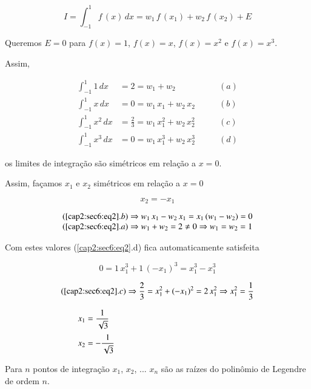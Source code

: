 \begin{enumerate}
\begin{equation}
 \label{cap2:sec6:eq1}
 I = \int_{-1}^1 f\,(x) \, dx = w_1 \, f\,(x_1) + w_2 \, f\,(x_2) + E
\end{equation}

Queremos $E=0$ para $f(x)=1$, $f(x)=x$, $f(x)=x^{2}$ e $f(x)=x^{3}$.

Assim,

\begin{equation}
 \label{cap2:sec6:eq2}
 \begin{array}{llr}
  \int_{-1}^1 1 \, dx & = 2 = w_1 + w_2 \qquad & (a) \\
  \int_{-1}^1 x \, dx & = 0 = w_1\,x_1 + w_2\,x_2 \qquad & (b) \\
  \int_{-1}^1 x^2 \, dx & = \displaystyle \frac{2}{3} = w_1\,x_1^2 + w_2\,x_2^2 \qquad & (c) \\
  \int_{-1}^1 x^3 \, dx & = 0 = w_1\,x_1^3 + w_2\,x_2^3 \qquad & (d)
 \end{array}
\end{equation}

os limites de integração são simétricos em relação a $x=0$.

Assim, façamos $x_{1}$ e $x_{2}$ simétricos em relação a $x=0$

\[x_{2} = -x_{1}\]

\[
 \begin{array}{l}
  (\ref{cap2:sec6:eq2}.b) \Rightarrow w_1\,x_1 - w_2\,x_1 = x_1\,(w_1 - w_2) = 0 \\
  (\ref{cap2:sec6:eq2}.a) \Rightarrow w_1 + w_2 = 2 \neq 0 \Rightarrow w_1 = w_2 = 1
 \end{array}
\]

Com estes valores (\ref{cap2:sec6:eq2}.d) fica automaticamente satisfeita

\[
 0 = 1\,x_1^3 + 1\,(-x_1)^3 = x_1^3 - x_1^3
\]

\[
 \begin{array}{l}
  (\ref{cap2:sec6:eq2}.c) \Rightarrow \displaystyle \frac{2}{3} = x_1^2 + (-x_1)^2 = 2\,x_1^2 \Rightarrow x_1^2 = \frac{1}{3} \\ \\
  \qquad x_1 = \displaystyle \frac{1}{\sqrt{3}} \vspace*{0.2cm} \\
  \qquad x_2 = - \displaystyle \frac{1}{\sqrt{3}}
 \end{array}
\]


Para $n$ pontos de integração $x_{1}$, $x_{2}$, ... $x_{n}$ são as raízes do polinômio de Legendre de ordem $n$.


\end{enumerate}
